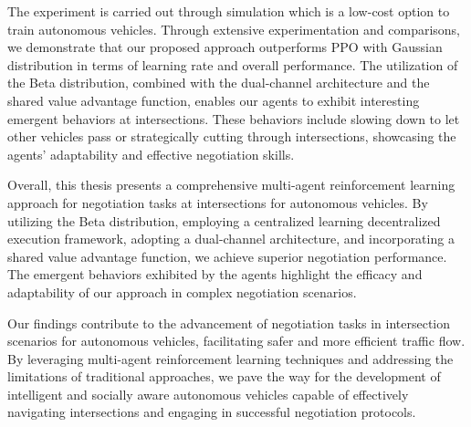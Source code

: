 \begin{e-abstract}
The experiment is carried out through simulation which is a low-cost option to train autonomous vehicles. Through extensive experimentation and comparisons, we demonstrate that our proposed approach outperforms PPO with Gaussian distribution in terms of learning rate and overall performance. The utilization of the Beta distribution, combined with the dual-channel architecture and the shared value advantage function, enables our agents to exhibit interesting emergent behaviors at intersections. These behaviors include slowing down to let other vehicles pass or strategically cutting through intersections, showcasing the agents' adaptability and effective negotiation skills.

Overall, this thesis presents a comprehensive multi-agent reinforcement learning approach for negotiation tasks at intersections for autonomous vehicles. By utilizing the Beta distribution, employing a centralized learning decentralized execution framework, adopting a dual-channel architecture, and incorporating a shared value advantage function, we achieve superior negotiation performance. The emergent behaviors exhibited by the agents highlight the efficacy and adaptability of our approach in complex negotiation scenarios.

Our findings contribute to the advancement of negotiation tasks in intersection scenarios for autonomous vehicles, facilitating safer and more efficient traffic flow. By leveraging multi-agent reinforcement learning techniques and addressing the limitations of traditional approaches, we pave the way for the development of intelligent and socially aware autonomous vehicles capable of effectively navigating intersections and engaging in successful negotiation protocols.
\end{e-abstract}
